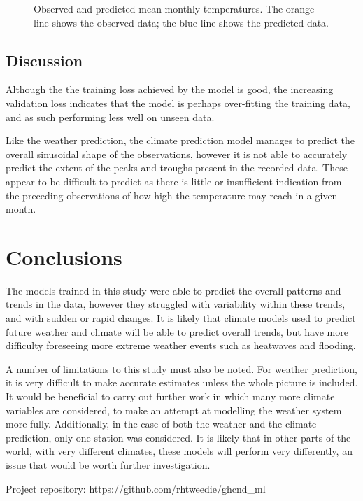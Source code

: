 \documentclass[12pt]{article}
\begin{document}
    \begin{figure}
        \centering
        
        \caption{Observed and predicted mean monthly temperatures. The orange line shows the observed data; the blue line shows the predicted data.}
        \label{fig:climate_prediction}
    \end{figure}

\subsection{Discussion}

     Although the the training loss achieved by the model is good, the increasing validation loss indicates that the model is perhaps over-fitting the training data, and as such performing less well on unseen data.

     Like the weather prediction, the climate prediction model manages to predict the overall sinusoidal shape of the observations, however it is not able to accurately predict the extent of the peaks and troughs present in the recorded data. These appear to be difficult to predict as there is little or insufficient indication from the preceding observations of how high the temperature may reach in a given month.
     
\section{Conclusions}

    The models trained in this study were able to predict the overall patterns and trends in the data, however they struggled with variability within these trends, and with sudden or rapid changes. It is likely that climate models used to predict future weather and climate will be able to predict overall trends, but have more difficulty foreseeing more extreme weather events such as heatwaves and flooding.

    A number of limitations to this study must also be noted. For weather prediction, it is very difficult to make accurate estimates unless the whole picture is included. It would be beneficial to carry out further work in which many more climate variables are considered, to make an attempt at modelling the weather system more fully. Additionally, in the case of both the weather and the climate prediction, only one station was considered. It is likely that in other parts of the world, with very different climates, these models will perform very differently, an issue that would be worth further investigation.


\vspace{15pt}    
\noindent Project repository: https://github.com/rhtweedie/ghcnd\_ml

\printbibliography
\end{document}
